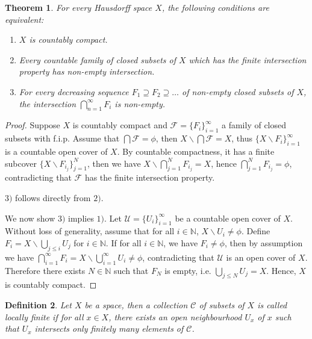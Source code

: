 \documentclass[12pt,oneside,english]{amsbook}
\numberwithin{equation}{section} %
\numberwithin{figure}{section} %
\theoremstyle{plain}
\numberwithin{section}{chapter}
\newtheorem{thm}{Theorem}[section]
\theoremstyle{plain}
\newtheorem{defn}[thm]{Definition}
\begin{document}
\begin{thm}
  For every Hausdorff space $X$, the following conditions are equivalent:
  \begin{enumerate}
  \item $X$ is countably compact.
  \item Every countable family of closed subsets of $X$ which has the finite intersection property has non-empty intersection.
  \item For every decreasing sequence $F_1 \supseteq F_2 \supseteq \ldots$ of non-empty closed subsets of $X$, the intersection $\bigcap_{n = 1}^{\infty}F_{i}$ is non-empty.
  \end{enumerate}
\end{thm}
\begin{proof}
  Suppose $X$ is countably compact and $\mathcal{F} = \{F_{i}\}_{i = 1}^{\infty}$  a family of closed subsets with f.i.p. Assume that $\bigcap \mathcal{F} = \phi$, then $X \backslash \bigcap \mathcal{F} = X$, thus $\{X \backslash F_i \}_{i = 1}^{\infty}$ is a countable open cover of $X$. By countable compactness, it has a finite subcover $\{X \backslash F_{i_j}\}_{j = 1}^{N}$, then we have $X \backslash \bigcap_{j = 1}^{N}F_{i_j} = X$, hence $\bigcap_{j = 1}^{N}F_{i_j} = \phi$, contradicting that $\mathcal{F}$ has the finite intersection property.

  $3)$ follows directly from $2)$.

  We now show $3)$ implies $1)$. Let $\mathcal{U} = \{U_i\}_{i = 1}^{\infty}$ be a countable open cover of $X$. Without loss of generality, assume that  for all $i \in \mathbb{N}$, $X \backslash U_i \neq \phi$. Define $F_i = X \backslash \bigcup_{j \leq i}U_j$ for $i \in \mathbb{N}$. If for all $i \in \mathbb{N}$, we have $F_i \neq \phi$, then by assumption we have $\bigcap_{i = 1}^{\infty}F_i  = X \backslash \bigcup_{i = 1}^{\infty}U_i \neq \phi$, contradicting that $\mathcal{U}$ is an open cover of $X$. Therefore there exists $N \in \mathbb{N}$ such that $F_N$ is empty, i.e. $\bigcup_{j \leq N}U_j = X$. Hence, $X$ is countably compact.  
\end{proof}

\begin{defn}
  Let $X$ be a space, then a collection $\mathcal{C}$ of subsets of $X$ is called locally finite if for all $x \in X$, there exists an open neighbourhood $U_{x}$ of $x$ such that $U_{x}$ intersects only finitely many elements of $\mathcal{C}$.
\end{defn}
\end{document}
